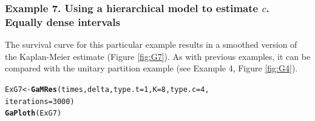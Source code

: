 \documentclass[letterpaper]{article}\usepackage[]{graphicx}\usepackage[]{color}
\makeatletter
\newcommand{\hlnum}[1]{\textcolor[rgb]{0.686,0.059,0.569}{#1}}%
\newcommand{\hlstd}[1]{\textcolor[rgb]{0.345,0.345,0.345}{#1}}%
\newcommand{\hlkwb}[1]{\textcolor[rgb]{0.69,0.353,0.396}{#1}}%
\newcommand{\hlkwc}[1]{\textcolor[rgb]{0.333,0.667,0.333}{#1}}%
\newcommand{\hlkwd}[1]{\textcolor[rgb]{0.737,0.353,0.396}{\textbf{#1}}}%
\newenvironment{kframe}{%
 \def\at@end@of@kframe{}%
 \ifinner\ifhmode%
  \def\at@end@of@kframe{\end{minipage}}%
  \begin{minipage}{\columnwidth}%
 \fi\fi%
 \def\FrameCommand##1{\hskip\@totalleftmargin \hskip-\fboxsep
 \colorbox{shadecolor}{##1}\hskip-\fboxsep
     \hskip-\linewidth \hskip-\@totalleftmargin \hskip\columnwidth}%
 \MakeFramed {\advance\hsize-\width
   \@totalleftmargin\z@ \linewidth\hsize
   \@setminipage}}%
 {\par\unskip\endMakeFramed%
 \at@end@of@kframe}
\newenvironment{knitrout}{}{} %
\makeatother
\begin{document}
\subsubsection{Example 7. Using a hierarchical model to estimate $c$. Equally dense intervals}

The survival curve for this particular example results in a smoothed version of the Kaplan-Meier estimate (Figure \ref{fig:G7}). As with previous examples, it can be compared with the unitary partition example (see Example 4, Figure \ref{fig:G4}). 

\begin{knitrout}
\color{fgcolor}\begin{kframe}
\begin{alltt}
\hlstd{ExG7} \hlkwb{<-} \hlkwd{GaMRes}\hlstd{(times, delta,} \hlkwc{type.t} \hlstd{=} \hlnum{1}\hlstd{,} \hlkwc{K} \hlstd{=} \hlnum{8}\hlstd{,} \hlkwc{type.c} \hlstd{=} \hlnum{4}\hlstd{,}
               \hlkwc{iterations} \hlstd{=} \hlnum{3000}\hlstd{)}
\hlkwd{GaPloth}\hlstd{(ExG7)}
\end{alltt}
\end{kframe}
\end{knitrout}
\end{document}
